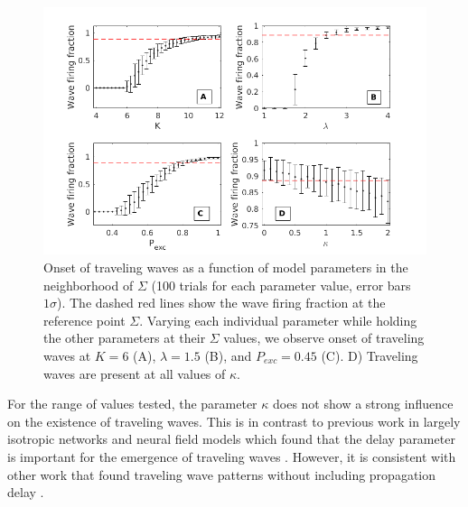 \begin{figure}[!htb]
 \centering
 \includegraphics[width=\textwidth]{fig/ParamWaveSim}
 \caption{Onset of traveling waves as a function of model parameters in the neighborhood of $\Sigma$ (100 trials for each parameter value, error bars $1\sigma$). 
         The dashed red lines show the wave firing fraction at the reference  point $\Sigma$.  
         Varying each individual parameter while holding the other parameters at their $\Sigma$ values, we observe onset of traveling waves at $K=6$ (A), $\lambda=1.5$ (B), and $P_{exc}=0.45$ (C).  
         D) Traveling waves are present at all values of $\kappa$. }
 \label{fig:wave_parameters}
\end{figure}

\FloatBarrier

For the range of values tested, the parameter $\kappa$ does not show a strong influence on the existence of traveling waves. 
This is in contrast to previous work in largely isotropic networks and neural field models which found that the delay parameter is important for the emergence of traveling waves \citet{Senk2020}\citet{Atay2006}\citet{Roxin2005}.
However, it is consistent with other work that found traveling wave patterns without including propagation delay \citet{Folias2012}\citet{Wyller2007}.

